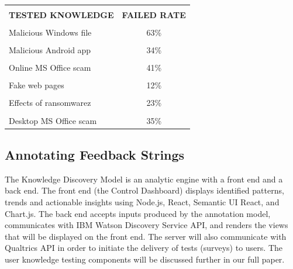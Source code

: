 \documentclass[conference]{IEEEtran}
\begin{document}
\begin{table}[]
\begin{tabular}{|l|c|}
\hline
{}&{} \\[-0.5em] 
{\textbf{TESTED KNOWLEDGE} } & \textbf{FAILED RATE} \\[2pt] \hline
& \\[-0.8em] 
Malicious Windows file                          & 63\%                 \\[2pt] \hline
{}&{} \\[-0.8em] 
Malicious Android app                           & 34\%                 \\[2pt] \hline
{}&{} \\[-0.8em] 
Online MS Office scam                           & 41\%                 \\[2pt] \hline
{}&{} \\[-0.8em] 
Fake web pages                                  & 12\%                 \\[2pt] \hline
{}&{} \\[-0.8em] 
Effects of ransomwarez                          & 23\%                 \\[2pt] \hline
{}&{} \\[-0.8em] 
Desktop MS Office scam                          & 35\%                 \\[2pt] \hline
\end{tabular}
\end{table}

\subsection{Annotating Feedback Strings}
The Knowledge Discovery Model is an analytic engine with a front end and a back end. The front end (the Control Dashboard) displays identified patterns, trends and actionable insights using Node.js, React, Semantic UI React, and Chart.js. The back end accepts inputs produced by the annotation model, communicates with IBM Watson Discovery Service API, and renders the views that will be displayed on the front end. The server will also communicate with Qualtrics API in order to initiate the delivery of tests (surveys) to users. The user knowledge testing components will be discussed further in our full paper.
\end{document}

